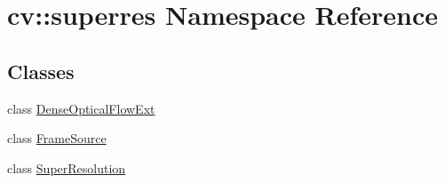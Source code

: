 \hypertarget{namespacecv_1_1superres}{\section{cv\-:\-:superres Namespace Reference}
\label{namespacecv_1_1superres}
}
\subsection*{Classes}
\begin{DoxyCompactItemize}
\item 
class \hyperlink{classcv_1_1superres_1_1DenseOpticalFlowExt}{Dense\-Optical\-Flow\-Ext}
\item 
class \hyperlink{classcv_1_1superres_1_1FrameSource}{Frame\-Source}
\item 
class \hyperlink{classcv_1_1superres_1_1SuperResolution}{Super\-Resolution}
\end{DoxyCompactItemize}
